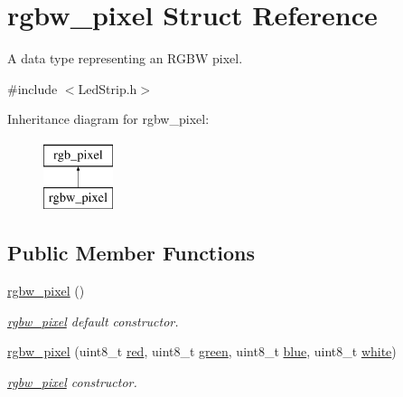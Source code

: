 \hypertarget{structrgbw__pixel}{}\section{rgbw\+\_\+pixel Struct Reference}
\label{structrgbw__pixel}


A data type representing an R\+G\+BW pixel.  




{\ttfamily \#include $<$Led\+Strip.\+h$>$}

Inheritance diagram for rgbw\+\_\+pixel\+:\begin{figure}[H]
\begin{center}
\leavevmode
\includegraphics[height=2.000000cm]{structrgbw__pixel}
\end{center}
\end{figure}
\subsection*{Public Member Functions}
\begin{DoxyCompactItemize}
\item 
\mbox{\label{structrgbw__pixel_a6ba880346007873f8dbf7349382ab6db}} 
\mbox{\hyperlink{structrgbw__pixel_a6ba880346007873f8dbf7349382ab6db}{rgbw\+\_\+pixel}} ()
\begin{DoxyCompactList}\small\item\em \mbox{\hyperlink{structrgbw__pixel}{rgbw\+\_\+pixel}} default constructor. \end{DoxyCompactList}\item 
\mbox{\hyperlink{structrgbw__pixel_a7ed17b32c052020ac00611b787f364b5}{rgbw\+\_\+pixel}} (uint8\+\_\+t \mbox{\hyperlink{structrgb__pixel_a1f2df0e809c6ae17e69a61ab9bf75a19}{red}}, uint8\+\_\+t \mbox{\hyperlink{structrgb__pixel_a48581a68a54cd5d7c2e9ebffc67c984b}{green}}, uint8\+\_\+t \mbox{\hyperlink{structrgb__pixel_aefc328d7500bdd757c22392610e4d3d0}{blue}}, uint8\+\_\+t \mbox{\hyperlink{structrgbw__pixel_a3134dfea8e33b3bf1aca1b834f2bf0a8}{white}})
\begin{DoxyCompactList}\small\item\em \mbox{\hyperlink{structrgbw__pixel}{rgbw\+\_\+pixel}} constructor. \end{DoxyCompactList}\end{DoxyCompactItemize}
